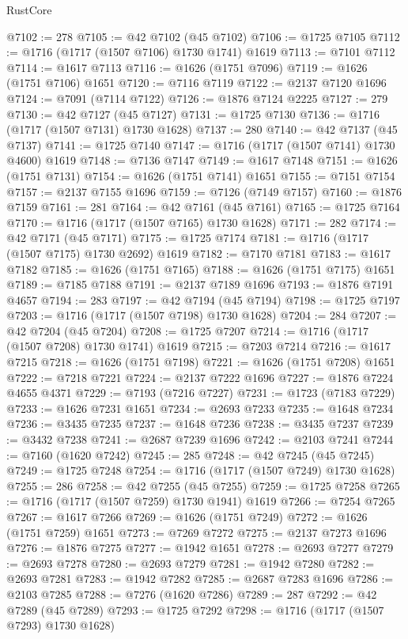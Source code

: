 \begin{lexlean}{RustCore}
\begin{coremodule}
@7102 := 278
@7105 := @42 @7102 (@45 @7102)
@7106 := @1725 @7105
@7112 := @1716 (@1717 (@1507 @7106) @1730 @1741) @1619
@7113 := @7101 @7112
@7114 := @1617 @7113
@7116 := @1626 (@1751 @7096)
@7119 := @1626 (@1751 @7106) @1651
@7120 := @7116 @7119
@7122 := @2137 @7120 @1696
@7124 := @7091 (@7114 @7122)
@7126 := @1876 @7124 @2225
@7127 := 279
@7130 := @42 @7127 (@45 @7127)
@7131 := @1725 @7130
@7136 := @1716 (@1717 (@1507 @7131) @1730 @1628)
@7137 := 280
@7140 := @42 @7137 (@45 @7137)
@7141 := @1725 @7140
@7147 := @1716 (@1717 (@1507 @7141) @1730 @4600) @1619
@7148 := @7136 @7147
@7149 := @1617 @7148
@7151 := @1626 (@1751 @7131)
@7154 := @1626 (@1751 @7141) @1651
@7155 := @7151 @7154
@7157 := @2137 @7155 @1696
@7159 := @7126 (@7149 @7157)
@7160 := @1876 @7159
@7161 := 281
@7164 := @42 @7161 (@45 @7161)
@7165 := @1725 @7164
@7170 := @1716 (@1717 (@1507 @7165) @1730 @1628)
@7171 := 282
@7174 := @42 @7171 (@45 @7171)
@7175 := @1725 @7174
@7181 := @1716 (@1717 (@1507 @7175) @1730 @2692) @1619
@7182 := @7170 @7181
@7183 := @1617 @7182
@7185 := @1626 (@1751 @7165)
@7188 := @1626 (@1751 @7175) @1651
@7189 := @7185 @7188
@7191 := @2137 @7189 @1696
@7193 := @1876 @7191 @4657
@7194 := 283
@7197 := @42 @7194 (@45 @7194)
@7198 := @1725 @7197
@7203 := @1716 (@1717 (@1507 @7198) @1730 @1628)
@7204 := 284
@7207 := @42 @7204 (@45 @7204)
@7208 := @1725 @7207
@7214 := @1716 (@1717 (@1507 @7208) @1730 @1741) @1619
@7215 := @7203 @7214
@7216 := @1617 @7215
@7218 := @1626 (@1751 @7198)
@7221 := @1626 (@1751 @7208) @1651
@7222 := @7218 @7221
@7224 := @2137 @7222 @1696
@7227 := @1876 @7224 @4655 @4371
@7229 := @7193 (@7216 @7227)
@7231 := @1723 (@7183 @7229)
@7233 := @1626 @7231 @1651
@7234 := @2693 @7233
@7235 := @1648 @7234
@7236 := @3435 @7235
@7237 := @1648 @7236
@7238 := @3435 @7237
@7239 := @3432 @7238
@7241 := @2687 @7239 @1696
@7242 := @2103 @7241
@7244 := @7160 (@1620 @7242)
@7245 := 285
@7248 := @42 @7245 (@45 @7245)
@7249 := @1725 @7248
@7254 := @1716 (@1717 (@1507 @7249) @1730 @1628)
@7255 := 286
@7258 := @42 @7255 (@45 @7255)
@7259 := @1725 @7258
@7265 := @1716 (@1717 (@1507 @7259) @1730 @1941) @1619
@7266 := @7254 @7265
@7267 := @1617 @7266
@7269 := @1626 (@1751 @7249)
@7272 := @1626 (@1751 @7259) @1651
@7273 := @7269 @7272
@7275 := @2137 @7273 @1696
@7276 := @1876 @7275
@7277 := @1942 @1651
@7278 := @2693 @7277
@7279 := @2693 @7278
@7280 := @2693 @7279
@7281 := @1942 @7280
@7282 := @2693 @7281
@7283 := @1942 @7282
@7285 := @2687 @7283 @1696
@7286 := @2103 @7285
@7288 := @7276 (@1620 @7286)
@7289 := 287
@7292 := @42 @7289 (@45 @7289)
@7293 := @1725 @7292
@7298 := @1716 (@1717 (@1507 @7293) @1730 @1628)

\end{coremodule}
\end{lexlean}
